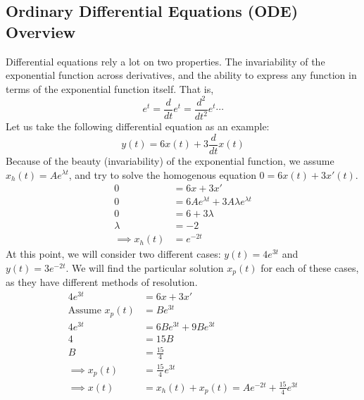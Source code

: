 \documentclass[nobib]{tufte-handout}
\begin{document}
\subsection{Ordinary Differential Equations (ODE) Overview}
Differential equations rely a lot on two properties. The invariability of the
exponential function across derivatives, and the ability to express any
function in terms of the exponential function itself. That is,\\
\begin{equation*}
    e^t=\frac{d}{dt}e^t=\frac{d^2}{dt^2}e^t \cdots
\end{equation*}
Let us take the following differential equation as an example:
\begin{equation*}
    y(t)=6x(t)+3\frac{d}{dt}x(t)
\end{equation*}
Because of the beauty (invariability) of the exponential function, we assume $x_h(t)=Ae^{\lambda t}$, and try to solve the homogenous equation $0=6x(t)+3x'(t)$.
\begin{align*}
    0               & = 6x+3x'                                     \\
    0               & = 6Ae^{\lambda t} + 3A \lambda e^{\lambda t} \\
    0               & = 6+3\lambda                                 \\
    \lambda         & = -2                                         \\
    \implies x_h(t) & = e^{-2t}
\end{align*}
At this point, we will consider two different cases: $y(t) = 4e^{3t}$ and $y(t) = 3e^{-2t}$.
We will find the particular solution $x_p(t)$ for each of these cases, as they have different methods of resolution.
\begin{align*}
    4e^{3t}               & = 6x+3x'                                    \\
    \text{Assume } x_p(t) & = Be^{3t}                                   \\
    4e^{3t}               & = 6Be^{3t} + 9Be^{3t}                       \\
    4                     & = 15B                                       \\
    B                     & = \frac{15}{4}                              \\
    \implies x_p(t)       & = \frac{15}{4}e^{3t}                        \\
    \implies x(t)         & = x_h(t)+x_p(t)=Ae^{-2t}+\frac{15}{4}e^{3t}
\end{align*}
\end{document}
